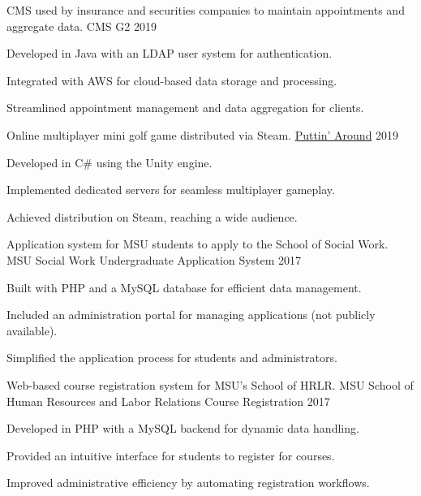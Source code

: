 
\begin{cventries}

  \cventry
    {CMS used by insurance and securities companies to maintain appointments and aggregate data.}
    {CMS G2}
    {}
    {2019}
    {
      \begin{cvitems}
        \item {Developed in Java with an LDAP user system for authentication.}
        \item {Integrated with AWS for cloud-based data storage and processing.}
        \item {Streamlined appointment management and data aggregation for clients.}
      \end{cvitems}
    }

  \cventry
    {Online multiplayer mini golf game distributed via Steam.}
    {\href{https://store.steampowered.com/app/1002650/Puttin_Around/}{Puttin' Around}}
    {}
    {2019}
    {
      \begin{cvitems}
        \item {Developed in C\# using the Unity engine.}
        \item {Implemented dedicated servers for seamless multiplayer gameplay.}
        \item {Achieved distribution on Steam, reaching a wide audience.}
      \end{cvitems}
    }

  \cventry
    {Application system for MSU students to apply to the School of Social Work.}
    {MSU Social Work Undergraduate Application System}
    {}
    {2017}
    {
      \begin{cvitems}
        \item {Built with PHP and a MySQL database for efficient data management.}
        \item {Included an administration portal for managing applications (not publicly available).}
        \item {Simplified the application process for students and administrators.}
      \end{cvitems}
    }

  \cventry
    {Web-based course registration system for MSU's School of HRLR.}
    {MSU School of Human Resources and Labor Relations Course Registration}
    {}
    {2017}
    {
      \begin{cvitems}
        \item {Developed in PHP with a MySQL backend for dynamic data handling.}
        \item {Provided an intuitive interface for students to register for courses.}
        \item {Improved administrative efficiency by automating registration workflows.}
      \end{cvitems}
    }

\end{cventries}